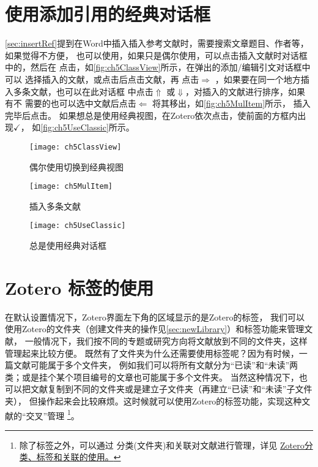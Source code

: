 \documentclass[cn,11pt,chinese]{elegantbook}
\begin{document}
	\section{使用添加引用的经典对话框} \label{sec:classView}				
		\cref{sec:insertRef}提到在Word中插入插入参考文献时，需要搜索文章题目、作者等，如果觉得不方便，
		也可以使用，如果只是偶尔使用，可以点击插入文献时对话框中的，然后在
		点击，如\autoref{fig:ch5ClassView}所示，在弹出的添加/编辑引文对话框中可以
		选择插入的文献，或点击后点击文献，再
		点击$\Rightarrow$ ，如果要在同一个地方插入多条文献，也可以在此对话框
		中点击$\Uparrow$ 或$\Downarrow$，对插入的文献进行排序，如果有不
		需要的也可以选中文献后点击$\Leftarrow$ 将其移出，如\autoref{fig:ch5MulItem}所示，
		插入完毕后点击。
		如果想总是使用经典视图，在Zotero依次点击，使前面的方框内出现$\checkmark$，
		如\autoref{fig:ch5UseClassic}所示。
			\begin{figure}[htbp]
				\centering
				\texttt{[image: ch5ClassView]}
				\caption{偶尔使用切换到经典视图}
				\label{fig:ch5ClassView}
			\end{figure}
			\begin{figure}[htbp]
				\centering
				\texttt{[image: ch5MulItem]}
				\caption{插入多条文献}
				\label{fig:ch5MulItem}
			\end{figure}
			\begin{figure}[htbp]
				\centering
				\texttt{[image: ch5UseClassic]}
				\caption{总是使用经典对话框}
				\label{fig:ch5UseClassic}
			\end{figure}

	\section{Zotero 标签的使用} \label{sec:tag}
			在默认设置情况下，Zotero界面左下角的区域显示的是Zotero的标签，
			我们可以使用Zotero的文件夹（创建文件夹的操作见\cref{sec:newLibrary}）和标签功能来管理文献，
			一般情况下，我们按不同的专题或研究方向将文献放到不同的文件夹，这样管理起来比较方便。
			既然有了文件夹为什么还需要使用标签呢？因为有时候，一篇文献可能属于多个文件夹，
			例如我们可以将所有文献分为“已读”和“未读”两类；或是挂个某个项目编号的文章也可能属于多个文件夹。
			当然这种情况下，也可以把文献复制到不同的文件夹或是建立子文件夹（再建立“已读”和“未读”子文件夹），
			但操作起来会比较麻烦。这时候就可以使用Zotero的标签功能，实现这种文献的“交叉”管理
			\footnote{除了标签之外，可以通过
		分类(文件夹)和关联对文献进行管理，详见
		\href{https://zhuanlan.zhihu.com/p/275707703}{Zotero分类、标签和关联的使用。}}。
			
\end{document}
